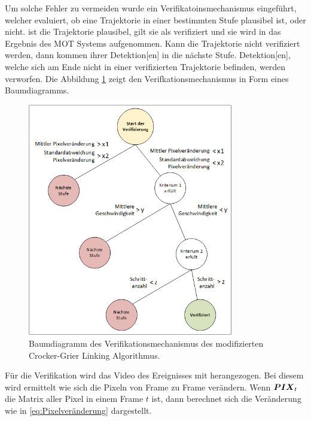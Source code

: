 Um solche Fehler zu vermeiden wurde ein Verifikatoinsmechanismus eingeführt, welcher evaluiert, ob eine \gls{Trajektorie} in einer bestimmten Stufe plausibel ist, oder nicht. ist die \gls{Trajektorie} plausibel, gilt sie als verifiziert und sie wird in das Ergebnis des \gls{MOT} Systems aufgenommen. Kann die \gls{Trajektorie} nicht verifiziert werden, dann kommen ihrer \gls{Detektion}[en] in die nächste Stufe. \gls{Detektion}[en], welche sich am Ende nicht in einer verifizierten \gls{Trajektorie} befinden, werden verworfen. Die Abbildung \ref{fig:TreeCrockGrierVerif} zeigt den Verifkationsmechanismus in Form eines Baumdiagramms. 

\begin{figure}[H]
    \centering
    \includegraphics[width=0.8\textwidth]{img/Grafiken/Baumdiagramm Verifizierung der Trajektorien.png}
    \caption[Baumdiagramm der Verifikation des modifizierten Crocker-Grier Algorithmus.]{Baumdiagramm des Verifikationsmechanismus des modifizierten Crocker-Grier Linking Algorithmus.}
    \label{fig:TreeCrockGrierVerif}
\end{figure}

Für die Verifikation wird das Video des Ereignisses mit herangezogen. Bei diesem wird ermittelt wie sich die Pixeln von \gls{Frame} zu \gls{Frame} verändern. Wenn \(\boldsymbol{PIX}_t\) die Matrix aller Pixel in einem \gls{Frame} \(t\) ist, dann berechnet sich die Veränderung wie in \autoref{eq:Pixelveränderung} dargestellt.

